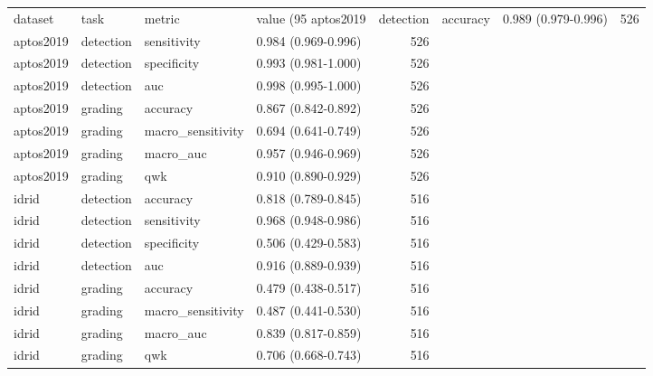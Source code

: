 \begin{tabular}{llllr}
\toprule
dataset & task & metric & value (95%
\midrule
aptos2019 & detection & accuracy & 0.989 (0.979-0.996) & 526 \\
aptos2019 & detection & sensitivity & 0.984 (0.969-0.996) & 526 \\
aptos2019 & detection & specificity & 0.993 (0.981-1.000) & 526 \\
aptos2019 & detection & auc & 0.998 (0.995-1.000) & 526 \\
aptos2019 & grading & accuracy & 0.867 (0.842-0.892) & 526 \\
aptos2019 & grading & macro_sensitivity & 0.694 (0.641-0.749) & 526 \\
aptos2019 & grading & macro_auc & 0.957 (0.946-0.969) & 526 \\
aptos2019 & grading & qwk & 0.910 (0.890-0.929) & 526 \\
idrid & detection & accuracy & 0.818 (0.789-0.845) & 516 \\
idrid & detection & sensitivity & 0.968 (0.948-0.986) & 516 \\
idrid & detection & specificity & 0.506 (0.429-0.583) & 516 \\
idrid & detection & auc & 0.916 (0.889-0.939) & 516 \\
idrid & grading & accuracy & 0.479 (0.438-0.517) & 516 \\
idrid & grading & macro_sensitivity & 0.487 (0.441-0.530) & 516 \\
idrid & grading & macro_auc & 0.839 (0.817-0.859) & 516 \\
idrid & grading & qwk & 0.706 (0.668-0.743) & 516 \\
\bottomrule
\end{tabular}
